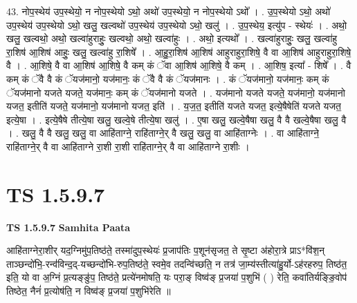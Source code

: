 \documentclass[17pt]{extarticle}
\begin{document}
43. नोप॒स्थेय॑ उप॒स्थेयो॒ न नोप॒स्थेयो ऽथो॒ अथो॑ उप॒स्थेयो॒ न नोप॒स्थेयो ऽथो᳚ । . उ॒प॒स्थेयो ऽथो॒ अथो॑ उप॒स्थेय॑ उप॒स्थेयो ऽथो॒ खलु॒ खल्वथो॑ उप॒स्थेय॑ उप॒स्थेयो ऽथो॒ खलु॑ । . उ॒प॒स्थेय॒ इत्यु॑प - स्थेयः॑ । . अथो॒ खलु॒ खल्वथो॒ अथो॒ खल्वा॑हुराहुः॒ खल्वथो॒ अथो॒ खल्वा॑हुः । . अथो॒ इत्यथो᳚ । . खल्वा॑हुराहुः॒ खलु॒ खल्वा॑हु रा॒शिष॑ आ॒शिष॑ आहुः॒ खलु॒ खल्वा॑हु रा॒शिषे᳚ । . आ॒हु॒रा॒शिष॑ आ॒शिष॑ आहुराहुरा॒शिषे॒ वै वा आ॒शिष॑ आहुराहुरा॒शिषे॒ वै । . आ॒शिषे॒ वै वा आ॒शिष॑ आ॒शिषे॒ वै कम् कं ॅवा आ॒शिष॑ आ॒शिषे॒ वै कम् । . आ॒शिष॒ इत्या᳚ - शिषे᳚ । . वै कम् कं ॅवै वै कं ॅयज॑मानो॒ यज॑मानः॒ कं ॅवै वै कं ॅयज॑मानः । . कं ॅयज॑मानो॒ यज॑मानः॒ कम् कं ॅयज॑मानो यजते यजते॒ यज॑मानः॒ कम् कं ॅयज॑मानो यजते । . यज॑मानो यजते यजते॒ यज॑मानो॒ यज॑मानो यजत॒ इतीति॑ यजते॒ यज॑मानो॒ यज॑मानो यजत॒ इति॑ । . य॒ज॒त॒ इतीति॑ यजते यजत॒ इत्ये॒षैषेति॑ यजते यजत॒ इत्ये॒षा । . इत्ये॒षैषे तीत्ये॒षा खलु॒ खल्वे॒षे तीत्ये॒षा खलु॑ । . ए॒षा खलु॒ खल्वे॒षैषा खलु॒ वै वै खल्वे॒षैषा खलु॒ वै । . खलु॒ वै वै खलु॒ खलु॒ वा आहि॑ताग्ने॒ राहि॑ताग्ने॒र् वै खलु॒ खलु॒ वा आहि॑ताग्नेः । . वा आहि॑ताग्ने॒ राहि॑ताग्ने॒र् वै वा आहि॑ताग्ने रा॒शी रा॒शी राहि॑ताग्ने॒र् वै वा आहि॑ताग्ने रा॒शीः । \newline
\pagebreak
{}
\section*{ TS 1.5.9.7 }

\textbf{TS 1.5.9.7 } \newline
\textbf{Samhita Paata} \newline

आहि॑ताग्नेरा॒शीर् यद॒ग्निमु॑प॒तिष्ठ॑ते॒ तस्मा॑दुप॒स्थेयः॑ प्र॒जाप॑तिः प॒शून॑सृजत॒ ते सृ॒ष्टा अ॑होरा॒त्रे प्राऽ*वि॑श॒न् ताञ्छन्दो॑भि॒-रन्व॑॑विन्द॒द्-यच्छन्दो॑भि-रुप॒तिष्ठ॑ते॒ स्वमे॒व तदन्वि॑च्छति॒ न तत्र॑ जा॒म्य॑स्तीत्या॑हु॒र्यो-ऽह॑रहरुप॒ तिष्ठ॑त॒ इति॒ यो वा अ॒ग्निं प्र॒त्यङ्ङु॑प॒ तिष्ठ॑ते॒ प्रत्ये॑नमोषति॒ यः परा॒ङ् विष्व॑ङ् प्र॒जया॑ प॒शुभि॑ ( ) रेति॒ कवा॑तिर्यङ्ङि॒वोप॑ तिष्ठेत॒ नैनं॑ प्र॒त्योष॑ति॒ न विष्व॑ङ् प्र॒जया॑ प॒शुभि॑रेति ॥ \newline
\end{document}

